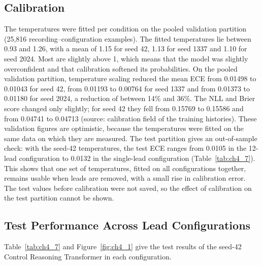 \subsection{Calibration}\label{sec:ch4_4_2}

The temperatures were fitted per condition on the pooled validation partition (25,816 recording--configuration examples). The fitted temperatures lie between 0.93 and 1.26, with a mean of 1.15 for seed 42, 1.13 for seed 1337 and 1.10 for seed 2024. Most are slightly above 1, which means that the model was slightly overconfident and that calibration softened its probabilities. On the pooled validation partition, temperature scaling reduced the mean ECE from 0.01498 to 0.01043 for seed 42, from 0.01193 to 0.00764 for seed 1337 and from 0.01373 to 0.01180 for seed 2024, a reduction of between 14\% and 36\%. The NLL and Brier score changed only slightly; for seed 42 they fell from 0.15769 to 0.15586 and from 0.04741 to 0.04713 (source: calibration field of the training histories). These validation figures are optimistic, because the temperatures were fitted on the same data on which they are measured. The test partition gives an out-of-sample check: with the seed-42 temperatures, the test ECE ranges from 0.0105 in the 12-lead configuration to 0.0132 in the single-lead configuration (Table~\ref{tab:ch4_7}). This shows that one set of temperatures, fitted on all configurations together, remains usable when leads are removed, with a small rise in calibration error. The test values before calibration were not saved, so the effect of calibration on the test partition cannot be shown.

\subsection{Test Performance Across Lead Configurations}\label{sec:ch4_4_3}

Table~\ref{tab:ch4_7} and Figure~\ref{fig:ch4_1} give the test results of the seed-42 Control Reasoning Transformer in each configuration.

